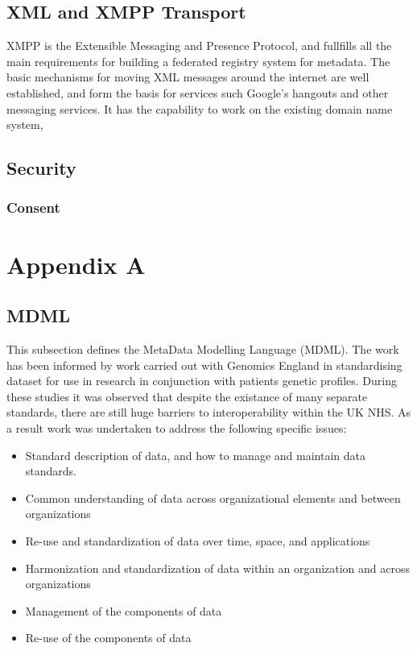 \documentclass{article}
\begin{document}
		\subsection{XML and XMPP Transport}
		XMPP is the Extensible Messaging and Presence Protocol, and fullfills all the main requirements for building a federated registry system for metadata. The basic mechanisms for moving XML messages around the internet are well established, and form the basis for services such Google's hangouts and other messaging services. It has the capability to work on the existing domain name system, 
		\subsection{Security}
		\subsubsection{Consent}
		
		\section{Appendix A}
		\subsection{MDML}
		This subsection defines the MetaData Modelling Language (MDML). The work has been informed by work carried out with Genomics England in standardising dataset for use in research in conjunction with patients genetic profiles. During these studies it was observed that despite the existance of many separate standards, there are still huge barriers to interoperability within the UK NHS. As a result work was undertaken to address the following specific issues:
		\begin{itemize}
			\item  Standard description of data, and how to manage and maintain data standards.
			\item Common understanding of data across organizational elements and between organizations
			\item Re-use and standardization of data over time, space, and applications
			\item Harmonization and standardization of data within an organization and across organizations
			\item Management of the components of data
			\item Re-use of the components of data
		\end{itemize}
		
\end{document}
